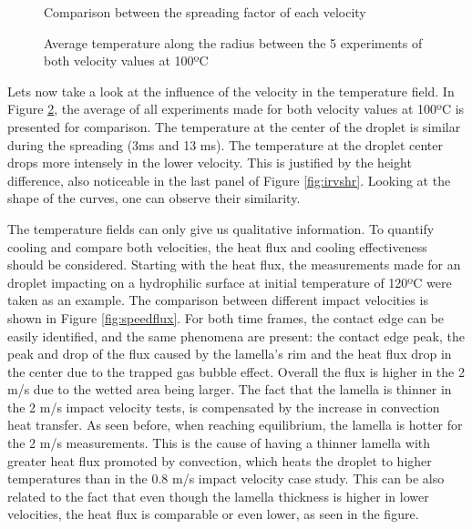 \begin{figure}[h]
\centering

\caption{Comparison between the spreading factor of each velocity}
\label{fig:diameter}
\end{figure}
\begin{figure}[h!]
\centering



\caption{Average temperature along the radius between the 5 experiments of both velocity values at 100ºC}
\label{fig:speed1}
\end{figure}

\par Lets now take a look at the influence of the velocity in the temperature field. In Figure \ref{fig:speed1}, the average of all experiments made for both velocity values at 100ºC is presented for comparison. The temperature at the center of the droplet is similar during the spreading (3ms and 13 ms). The temperature at the droplet center drops more intensely in the lower velocity. This is justified by the height difference, also noticeable in the last panel of Figure \ref{fig:irvshr}. Looking at the shape of the curves, one can observe their similarity.\\

\par The temperature fields can only give us qualitative information. To quantify cooling and compare both velocities, the heat flux and cooling effectiveness should be considered. Starting with the heat flux, the measurements made for an droplet impacting on a hydrophilic surface at initial temperature of 120ºC were taken as an example. The comparison between different impact velocities is shown in Figure \ref{fig:speedflux}. For both time frames, the contact edge can be easily identified, and the same phenomena are present: the contact edge peak, the peak and drop of the flux caused by the lamella's rim and the heat flux drop in the center due to the trapped gas bubble effect. Overall the flux is higher in the 2 m/s due to the wetted area being larger. The fact that the lamella is thinner in the 2 m/s impact velocity tests, is compensated by the increase in convection heat transfer. As seen before, when reaching equilibrium, the lamella is hotter for the 2 m/s measurements. This is the cause of having a thinner lamella with greater heat flux promoted by convection, which heats the droplet to higher temperatures than in the 0.8 m/s impact velocity case study. This can be also related to the fact that even though the lamella thickness is higher in lower velocities, the heat flux is comparable or even lower, as seen in the figure.\\

